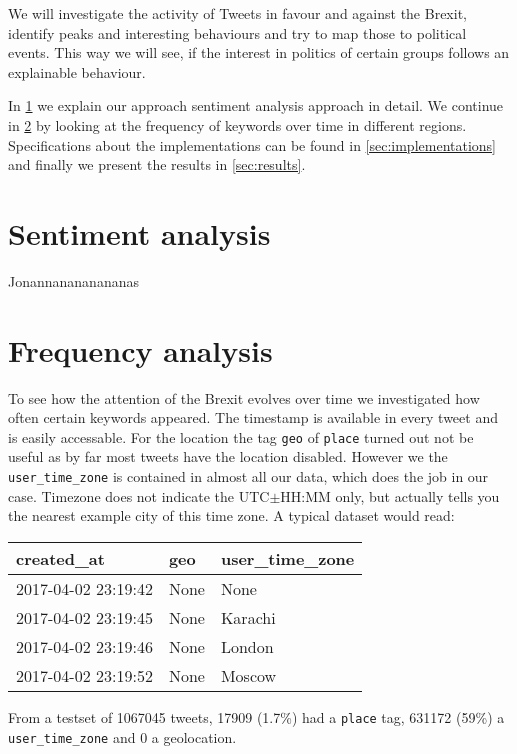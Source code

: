 \documentclass{emulateapj}
\begin{document}
We will investigate the activity of Tweets in favour and against the Brexit, identify peaks and interesting behaviours and try to map those to political events. 
This way we will see, if the interest in politics of certain groups follows an explainable behaviour.

In \ref{sec:sentiment-analysis} we explain our approach sentiment analysis approach in detail. 
We continue in \ref{sec:frequency-analysis} by looking at the frequency of keywords over time in different regions.
Specifications about the implementations can be found in \ref{sec:implementations} and finally we present the
results in \ref{sec:results}.

\section{Sentiment analysis}\label{sec:sentiment-analysis}

Jonannanananananas

\section{Frequency analysis}\label{sec:frequency-analysis}

To see how the attention of the Brexit evolves over time we investigated how often certain keywords appeared.
The timestamp is available in every tweet and is easily accessable.
For the location the tag \texttt{geo} of \texttt{place} turned out not be useful as by far most tweets have the location disabled.
However we the \texttt{user\_time\_zone} is contained in almost all our data, which does the job in our case. 
Timezone does not indicate the UTC$\pm$HH:MM only, but actually tells you the nearest example city of this time zone.
A typical dataset would read:
\newline\newline
{\ttfamily
  \begin{tabular}{|l|l|l|}
    \hline
    created\_at & geo & user\_time\_zone \\ \hline
    2017-04-02 23:19:42 & None & None \\ \hline
    2017-04-02 23:19:45 & None & Karachi \\ \hline
    2017-04-02 23:19:46 & None & London \\ \hline
    2017-04-02 23:19:52 & None & Moscow \\ \hline
  \end{tabular}
}
\newline\newline
From a testset of 1067045 tweets, 17909 (1.7\%) had a \texttt{place} tag, 631172 (59\%) a \texttt{user\_time\_zone} and 0 a geolocation.
\end{document}
